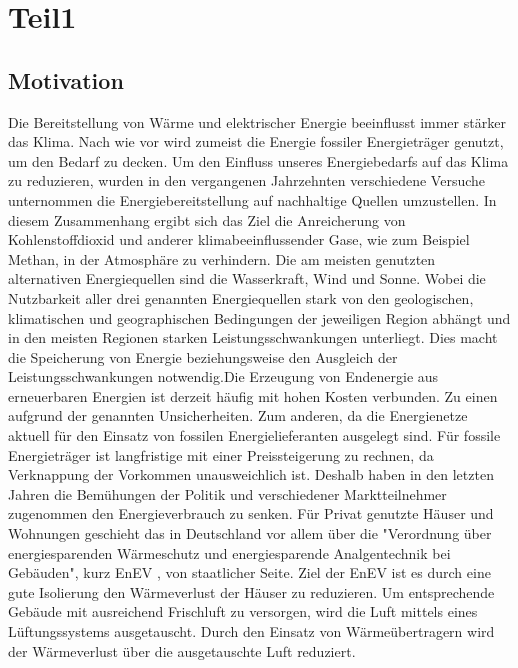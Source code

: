\chapter{Teil1}
\label{cha:Teil1}

\begin{normalsize}
\begin{LARGE}

\section{Motivation}
\label{sec:Motivation}

Die Bereitstellung von Wärme und elektrischer Energie beeinflusst immer stärker das Klima. Nach wie vor wird zumeist die Energie fossiler Energieträger genutzt, um den Bedarf zu decken. Um den Einfluss unseres Energiebedarfs auf das Klima zu reduzieren, wurden in den vergangenen Jahrzehnten verschiedene Versuche unternommen die Energiebereitstellung auf nachhaltige Quellen umzustellen. In diesem Zusammenhang ergibt sich das Ziel die Anreicherung von Kohlenstoffdioxid und anderer klimabeeinflussender Gase, wie zum Beispiel Methan, in der Atmosphäre zu verhindern. 
Die am meisten genutzten alternativen Energiequellen sind die Wasserkraft, Wind und Sonne. Wobei die Nutzbarkeit aller drei genannten Energiequellen stark von den geologischen, klimatischen und geographischen Bedingungen der jeweiligen Region abhängt und in den meisten Regionen starken Leistungsschwankungen unterliegt. Dies macht die Speicherung von Energie beziehungsweise den Ausgleich der Leistungsschwankungen notwendig.Die Erzeugung von Endenergie aus erneuerbaren Energien ist derzeit häufig mit hohen Kosten verbunden. Zu einen aufgrund der genannten Unsicherheiten. Zum anderen, da die Energienetze aktuell für den Einsatz von fossilen Energielieferanten ausgelegt sind. Für fossile Energieträger ist langfristige mit einer Preissteigerung zu rechnen,  da Verknappung der Vorkommen unausweichlich ist. 
Deshalb haben in den letzten Jahren die Bemühungen der Politik und verschiedener Marktteilnehmer zugenommen den Energieverbrauch zu senken. Für Privat genutzte Häuser und Wohnungen geschieht das in Deutschland vor allem über die "Verordnung über energiesparenden Wärmeschutz und energiesparende Analgentechnik bei Gebäuden", kurz EnEV \cite{.28.10.2015},  von staatlicher Seite. %
Ziel der EnEV ist es durch eine gute Isolierung den Wärmeverlust der Häuser zu reduzieren. Um entsprechende Gebäude mit ausreichend Frischluft zu versorgen, wird die Luft mittels eines Lüftungssystems ausgetauscht. Durch den Einsatz von Wärmeübertragern wird der Wärmeverlust über die ausgetauschte Luft reduziert. 


\end{LARGE}
\end{normalsize}
